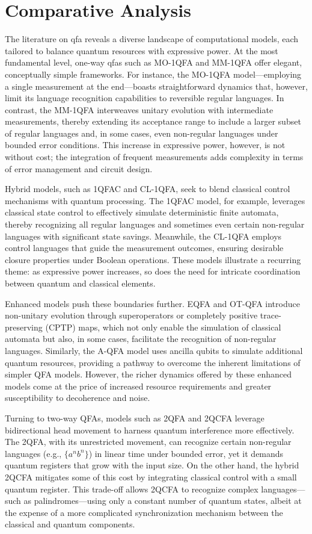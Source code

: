 \chapter{Comparative Analysis}
\label{chap:comparative-analysis}

The literature on \gls{qfa} reveals a diverse landscape of computational models, each tailored to balance quantum resources with expressive power. At the most fundamental level, one-way \glspl{qfa} such as MO-1QFA and MM-1QFA offer elegant, conceptually simple frameworks. For instance, the MO-1QFA model—employing a single measurement at the end—boasts straightforward dynamics that, however, limit its language recognition capabilities to reversible regular languages. In contrast, the MM-1QFA interweaves unitary evolution with intermediate measurements, thereby extending its acceptance range to include a larger subset of regular languages and, in some cases, even non-regular languages under bounded error conditions. This increase in expressive power, however, is not without cost; the integration of frequent measurements adds complexity in terms of error management and circuit design.

Hybrid models, such as 1QFAC and CL-1QFA, seek to blend classical control mechanisms with quantum processing. The 1QFAC model, for example, leverages classical state control to effectively simulate deterministic finite automata, thereby recognizing all regular languages and sometimes even certain non-regular languages with significant state savings. Meanwhile, the CL-1QFA employs control languages that guide the measurement outcomes, ensuring desirable closure properties under Boolean operations. These models illustrate a recurring theme: as expressive power increases, so does the need for intricate coordination between quantum and classical elements.

Enhanced models push these boundaries further. EQFA and OT-QFA introduce non-unitary evolution through superoperators or completely positive trace-preserving (CPTP) maps, which not only enable the simulation of classical automata but also, in some cases, facilitate the recognition of non-regular languages. Similarly, the A-QFA model uses ancilla qubits to simulate additional quantum resources, providing a pathway to overcome the inherent limitations of simpler QFA models. However, the richer dynamics offered by these enhanced models come at the price of increased resource requirements and greater susceptibility to decoherence and noise.

Turning to two-way QFAs, models such as 2QFA and 2QCFA leverage bidirectional head movement to harness quantum interference more effectively. The 2QFA, with its unrestricted movement, can recognize certain non-regular languages (e.g., \( \{a^n b^n\} \)) in linear time under bounded error, yet it demands quantum registers that grow with the input size. On the other hand, the hybrid 2QCFA mitigates some of this cost by integrating classical control with a small quantum register. This trade-off allows 2QCFA to recognize complex languages—such as palindromes—using only a constant number of quantum states, albeit at the expense of a more complicated synchronization mechanism between the classical and quantum components.

